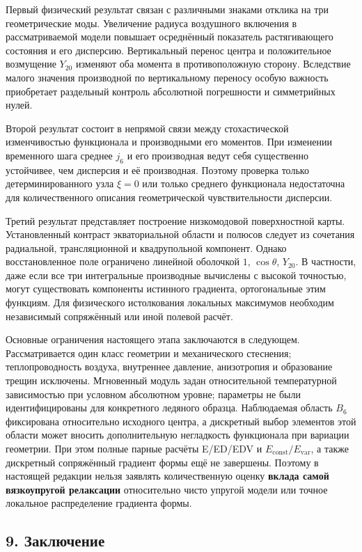 \documentclass[
]{article}
\begin{document}
Первый физический результат связан с различными знаками отклика на три
геометрические моды. Увеличение радиуса воздушного включения в
рассматриваемой модели повышает осреднённый показатель растягивающего
состояния и его дисперсию. Вертикальный перенос центра и положительное
возмущение \(Y_{20}\) изменяют оба момента в противоположную сторону.
Вследствие малого значения производной по вертикальному переносу особую
важность приобретает раздельный контроль абсолютной погрешности и
симметрийных нулей.

Второй результат состоит в непрямой связи между стохастической
изменчивостью функционала и производными его моментов. При изменении
временного шага среднее \(j_6\) и его производная ведут себя существенно
устойчивее, чем дисперсия и её производная. Поэтому проверка только
детерминированного узла \(\xi=0\) или только среднего функционала
недостаточна для количественного описания геометрической
чувствительности дисперсии.

Третий результат представляет построение низкомодовой поверхностной
карты. Установленный контраст экваториальной области и полюсов следует
из сочетания радиальной, трансляционной и квадрупольной компонент.
Однако восстановленное поле ограничено линейной оболочкой \(1\),
\(\cos\theta\), \(Y_{20}\). В частности, даже если все три интегральные
производные вычислены с высокой точностью, могут существовать компоненты
истинного градиента, ортогональные этим функциям. Для физического
истолкования локальных максимумов необходим независимый сопряжённый или
иной полевой расчёт.

Основные ограничения настоящего этапа заключаются в следующем.
Рассматривается один класс геометрии и механического стеснения;
теплопроводность воздуха, внутреннее давление, анизотропия и образование
трещин исключены. Мгновенный модуль задан относительной температурной
зависимостью при условном абсолютном уровне; параметры не были
идентифицированы для конкретного ледяного образца. Наблюдаемая область
\(B_6\) фиксирована относительно исходного центра, а дискретный выбор
элементов этой области может вносить дополнительную негладкость
функционала при вариации геометрии. При этом полные парные расчёты
E/ED/EDV и \(E_{\mathrm{const}}/E_{\mathrm{var}}\), а также дискретный
сопряжённый градиент формы ещё не завершены. Поэтому в настоящей
редакции нельзя заявлять количественную оценку \textbf{вклада самой
вязкоупругой релаксации} относительно чисто упругой модели или точное
локальное распределение градиента формы.

\subsection{9.
Заключение}\label{ux437ux430ux43aux43bux44eux447ux435ux43dux438ux435}
\end{document}
